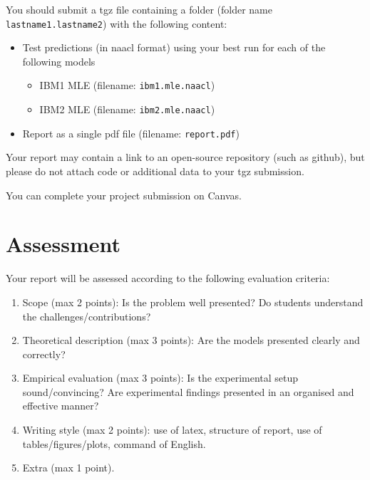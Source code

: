 You should submit a tgz file containing a folder (folder name {\tt lastname1.lastname2}) with the following content: 
\begin{itemize}
	\item Test predictions (in naacl format) using your best run for each of the following models
	\begin{itemize}
		\item IBM1 MLE (filename: {\tt ibm1.mle.naacl})
		\item IBM2 MLE (filename: {\tt ibm2.mle.naacl})
	\end{itemize}
	\item Report as a single pdf file (filename: {\tt report.pdf})
\end{itemize}

Your report may contain a link to an open-source repository (such as github), but please do not attach code or additional data to your tgz submission.

You can complete your project submission on Canvas.


\section{Assessment}

Your report will be assessed according to the following evaluation criteria:
\begin{enumerate}
	\item Scope (max 2 points): Is the problem well presented? Do students understand the challenges/contributions?
	\item Theoretical description (max 3 points): Are the models presented clearly and correctly?
	\item Empirical evaluation (max 3 points): Is the experimental setup sound/convincing? Are experimental findings presented in an organised and effective manner? 
	\item Writing style (max 2 points): use of latex, structure of report, use of tables/figures/plots, command of English.	
	\item Extra (max 1 point).
\end{enumerate}



